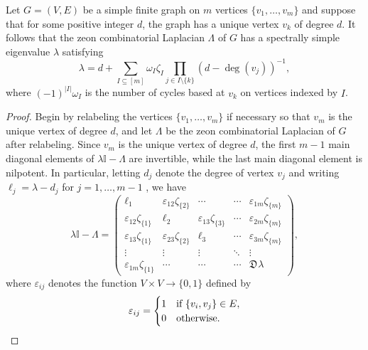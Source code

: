 \documentclass[10pt,a4paper]{amsart}
\newcommand{\mI}{\mathbb{I}}
\newcommand{\zdu}{\mathfrak{D}\mspace{1mu}}
\begin{document}
\begin{theorem}\label{laplacian eigenvalue}
Let $G=(V,E)$ be a simple finite graph on $m$ vertices $\{v_1, \ldots, v_m\}$ and suppose that for some positive integer $d$, the graph has a unique vertex $v_k$ of degree $d$.  It follows that the zeon combinatorial Laplacian $\Lambda$ of $G$ has a spectrally simple eigenvalue $\lambda$ satisfying \begin{equation*}
\lambda = d + \sum_{I\subseteq [m]}\omega_I\zeta_{I}\prod_{j\in I\setminus\{k\}}(d-\deg(v_j))^{-1},
\end{equation*}
where $(-1)^{|I|}\omega_I$ is the number of cycles based at $v_k$ on vertices indexed by $I$.
\end{theorem}

\begin{proof}
Begin by relabeling the vertices $\{v_1, \ldots, v_m\}$ if necessary so that $v_m$ is the unique vertex of degree $d$, and let $\Lambda$ be the zeon combinatorial Laplacian of $G$ after relabeling.  Since $v_m$ is the unique vertex of degree $d$, the first $m-1$ main diagonal elements of $\lambda\mI-\Lambda$ are invertible, while the last main diagonal element is nilpotent.   In particular, letting $d_j$ denote the degree of vertex $v_j$ and writing $\ell_j=\lambda-d_j$ for $j=1, \ldots, m-1$  , we have
\begin{equation}\label{form to triangularize}
\lambda\mI-\Lambda=\left(\begin{matrix}
\ell_1&\varepsilon_{12}\zeta_{\{2\}}&\cdots&\cdots&\varepsilon_{1m}\zeta_{\{m\}}\\
\varepsilon_{12}\zeta_{\{1\}}&\ell_2&\varepsilon_{13}\zeta_{\{3\}}&\cdots&\varepsilon_{2m}\zeta_{\{m\}}\\
\varepsilon_{13}\zeta_{\{1\}}&\varepsilon_{23}\zeta_{\{2\}}&\ell_3&\cdots&\varepsilon_{3m}\zeta_{\{m\}}\\
\vdots&\vdots&\vdots&\ddots&\vdots\\
\varepsilon_{1m}\zeta_{\{1\}}&\cdots&\cdots&\cdots&\zdu \lambda
\end{matrix}\right),  
 \end{equation}
where $\varepsilon_{ij}$ denotes the function $V\times V\to \{0,1\}$ defined by 
\begin{equation*}
\varepsilon_{ij}=\begin{cases}
1&\text{\rm if }\{v_i,v_j\}\in E,\\
0&\text{\rm otherwise.}
\end{cases}
\end{equation*}



\end{proof}
\end{document}
